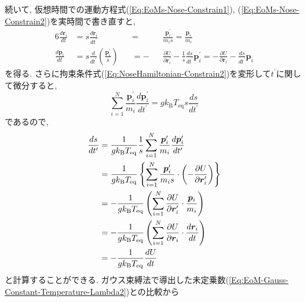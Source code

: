 続いて, 仮想時間での運動方程式(\ref{Eq:EoMs-Nose-Constrain1}), (\ref{Eq:EoMs-Nose-Constrain2})を実時間で書き直すと,
\begin{alignat}{6}
    \frac{d \bm{r}_{i}}{dt}
    &=
    s
    \frac{d \bm{r}_{i}}{dt^{\prime}}
    &&=&&
    \frac{\bm{p}_{i}^{\prime}}{m_{i}s}
    =
    \frac{\bm{p}_{i}}{m_{i}}
    \label{Eq:EoMs-Nose-Constrain1-t}
    \\
    \frac{d \bm{p}_{i}}{dt}
    &=
    s
    \frac{d}{dt^{\prime}}
    \left(
        \frac{\bm{p}_{i}^{\prime}}{s}
    \right)
    &&=-&&
    \frac{\partial U}{\partial \bm{r}_{i}^{\prime}}
    -
    \frac{1}{s}
    \frac{ds}{dt^{\prime}} \bm{p}_{i}^{\prime}
    =
    -
    \frac{\partial U}{\partial \bm{r}_{i}}
    -
    \frac{ds}{dt^{\prime}} \bm{p}_{i}
    \label{Eq:EoMs-Nose-Constrain2-t}
\end{alignat}
を得る. さらに拘束条件式(\ref{Eq:NoseHamiltonian-Constrain2})を変形して$t^{\prime}$に関して微分すると,
\begin{equation}
    \sum_{i=1}^{N}
    \frac{\bm{p}_{i}^{\prime}}{m_{i}}
    \frac{d \bm{p}_{i}^{\prime}}{dt^{\prime}}
    =
    g k_{\mathrm{B}} T_{\mathrm{eq}} s \frac{ds}{dt^{\prime}}
\end{equation}
であるので,
\begin{align}
    \frac{ds}{dt^{\prime}}
    &=
    \frac{1}{g k_{\mathrm{B}} T_{\mathrm{eq}}}
    \frac{1}{s}
    \sum_{i=1}^{N}
    \frac{\bm{p}_{i}^{\prime}}{m_{i}}
    \frac{d \bm{p}_{i}^{\prime}}{dt^{\prime}}
    \notag \\
    &=
    \frac{1}{g k_{\mathrm{B}} T_{\mathrm{eq}}}
    \left\{
        \sum_{i=1}^{N}
        \frac{\bm{p}_{i}^{\prime}}{m_{i}s} \cdot
        \left(
            - \frac{\partial U}{\partial \bm{r}_{i}^{\prime}}
        \right)
    \right\}
    \notag \\
    &=
    -
    \frac{1}{g k_{\mathrm{B}} T_{\mathrm{eq}}}
    \left(
        \sum_{i=1}^{N}
        \frac{\partial U}{\partial \bm{r}_{i}^{\prime}}
        \cdot
        \frac{\bm{p}_{i}}{m_{i}}
    \right)
    \notag \\
    &=
    -
    \frac{1}{g k_{\mathrm{B}} T_{\mathrm{eq}}}
    \left(
        \sum_{i=1}^{N}
        \frac{\partial U}{\partial \bm{r}_{i}}
        \cdot
        \frac{d \bm{r}_{i}}{dt}
    \right)
    \notag \\
    &=
    -
    \frac{1}{g k_{\mathrm{B}} T_{\mathrm{eq}}}
    \frac{dU}{dt}
    \notag
\end{align}
と計算することができる.
ガウス束縛法で導出した未定乗数(\ref{Eq:EoM-Gauss-Constant-Temperature-Lambda2})との比較から
